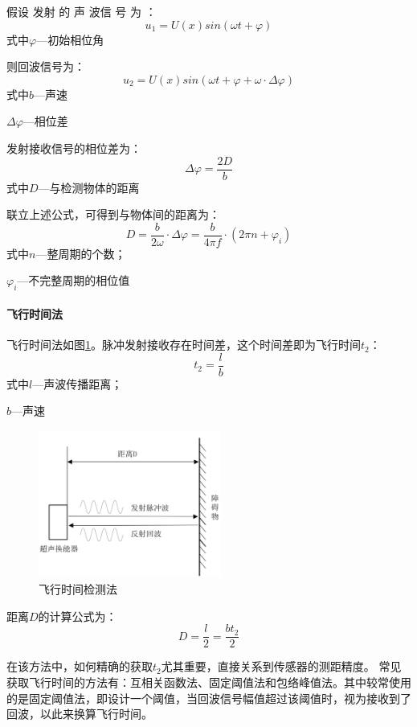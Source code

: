     假设 发射 的 声 波信 号 为 ：
    \begin{equation} 
    	u_1=U(x)sin(\omega t + \varphi)
    \end{equation}
式中\quad$\varphi$---初始相位角\par

则回波信号为：
\begin{equation}
	u_2=U(x)sin(\omega t + \varphi + \omega \cdot{\Delta \varphi})
\end{equation}
式中\quad$b$---声速\par
\quad$\Delta \varphi$---相位差\par
发射接收信号的相位差为：
\begin{equation}
	\Delta \varphi=\frac{2D}{b}
\end{equation}
式中\quad$D$---与检测物体的距离\par
联立上述公式，可得到与物体间的距离为：
\begin{equation}
	D=\frac{b}{2\omega}\cdot \Delta \varphi=\frac{b}{4\pi f}\cdot(2\pi n + \varphi_i)
\end{equation}
式中\quad$n$---整周期的个数；\par
\quad$\varphi_i$---不完整周期的相位值\par
   
    \paragraph{飞行时间法}
    飞行时间法如图\ref{飞行时间检测法}。脉冲发射接收存在时间差，这个时间差即为飞行时间$t_2$：
    \begin{equation}
    	t_2=\frac{l}{b}
    \end{equation}
式中\quad$l$---声波传播距离；\par
\quad$b$---声速\par

    \begin{figure}[!h]
    	\centering
    	\includegraphics[width=6cm]{figure/飞行时间检测法.png}
    	\caption{飞行时间检测法}
    	\label{飞行时间检测法}
    \end{figure}\par
    距离$D$的计算公式为：
    \begin{equation}
    	D=\frac{l}{2}=\frac{bt_2}{2}
    \end{equation}\par
	在该方法中，如何精确的获取$t_2$尤其重要，直接关系到传感器的测距精度。
	常见获取飞行时间的方法有：互相关函数法、固定阈值法和包络峰值法。其中较常使用的是固定阈值法，即设计一个阈值，当回波信号幅值超过该阈值时，视为接收到了回波，以此来换算飞行时间。\par
	       
